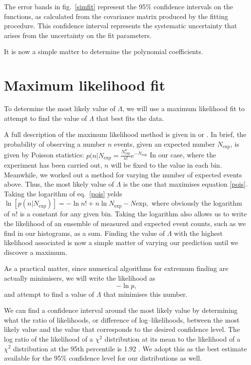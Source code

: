The error bands in fig.~\ref{simfit} represent the 95\% confidence intervals on the functions, as calculated from the covariance matrix produced by the fitting procedure. This confidence interval represents the systematic uncertainty that arises from the uncertainty on the fit parameters.

It is now a simple matter to determine the polynomial coefficients.

\section{Maximum likelihood fit}
To determine the most likely value of $\Lambda$, we will use a maximum likelihood fit to attempt to find the value of $\Lambda$ that best fits the data.

A full description of the maximum likelihood method is given in \cite{barlow} or \cite{pdg}. In brief, the probability of observing a number $n$ events, given an expected number $N_\text{exp}$, is given by Poisson statistics:
\(p(n|N_\text{exp}=\frac{N_\text{exp}^n}{n!}e^{-N_\text{exp}}\label{pois}\)
In our case, where the experiment has been carried out, $n$ will be fixed to the value in each bin. Meanwhile, we worked out a method for varying the number of expected events above. Thus, the most likely value of $\Lambda$ is the one that maximises equation \eqref{pois}. Taking the logarithm of eq.~\eqref{pois} yelds
\(\ln[p(n|N_\text{exp})]=-\ln n!+n\ln N_\text{exp}-N\text{exp},\)
where obviously the logarithm of $n!$ is a constant for any given bin. Taking the logarithm also allows us to write the likelihood of an ensemble of measured and expected event counts, such as we find in our histograms, as a sum. Finding the value of $\Lambda$ with the highest likelihood associated is now a simple matter of varying our prediction until we discover a maximum.

As a practical matter, since numerical algorithms for extremum finding are actually minimisers, we will write the likelihood as 
\[-\ln p,\]
and attempt to find a value of $\Lambda$ that minimises this number. 

We can find a confidence interval around the most likely value by determining what the ratio of likelihoods, or difference of log--likelihoods, between the most likely value and the value that corresponds to the desired confidence level. The log ratio of the likelihood of a $\chi^2$ distribution at its mean to the likelihood of a $\chi^2$ distribution at the 95th percentile is 1.92 \cite{pdg}. We adopt this as the best estimate available for the 95\% confidence level for our distributions as well.

